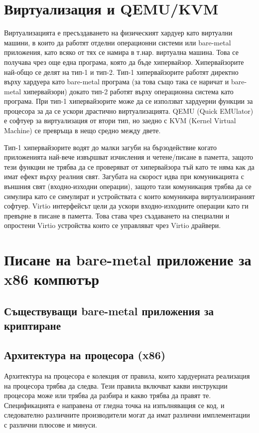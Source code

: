\section{Виртуализация и QEMU/KVM} \label{virtualization}
Виртуализацията е пресъздаването на физическият хардуер като виртуални машини, в които да работят отделни операционни системи или bare-metal приложения, като всяко от тях се намира в т.нар. виртуална машина. Това се получава чрез още една програма, която да бъде хипервайзор.
Хипервайзорите най-общо се делят на тип-1 и тип-2. Тип-1 хипервайзорите работят директно върху хардуера като bare-metal програма (за това също така се наричат и bare-metal хипервайзори) докато тип-2 работят върху операционна система като програма.
При тип-1 хипервайзорите може да се използват хардуерни функции за процесора за да се ускори драстично виртуализацията.\cite[глава~2.2.11]{intel-manual-1} QEMU (Quick EMUlator) е софтуер за виртуализация от втори тип, но заедно с KVM (Kernel Virtual Machine) се превръща в нещо средно между двете.

Тип-1 хипервайзорите водят до малки загуби на бързодействие когато приложенията най-вече извършват изчисления и четене/писане в паметта, защото тези функции не трябва да се проверяват от хипервайзора тъй като те няма как да имат ефект върху реалния свят. Загубата на скорост идва при комуникацията с външния свят (входно-изходни операции)\cite[глава~``Technique~3'']{vmware-whitepaper}, защото тази комуникация трябва да се симулира като се симулират и устройствата с които комуникира виртуализираният софтуер. Virtio интерфейсът цели да ускори входно-изходните операции като ги превърне в писане в паметта. Това става чрез създаването на специални и опростени Virtio устройства които се управляват чрез Virtio драйвери.

\section{Писане на bare-metal приложение за x86 компютър}
  \subsection{Съществуващи bare-metal приложения за криптиране}

  \subsection{Архитектура на процесора (x86)}
  Архитектура на процесора е колекция от правила, които хардуерната реализация на процесора трябва да следва. Тези правила включват какви инструкции процесора може или трябва да разбира и какво трябва да правят те. Спецификацията е направена от гледна точка на изпълняващия се код, и следователно различните производители могат да имат различни имплементации с различни плюсове и минуси.

